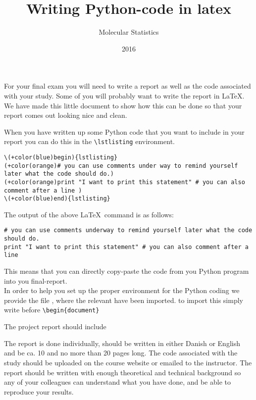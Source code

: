\documentclass{article}
\title{Writing Python-code in latex}
\author{Molecular Statistics}
\date{2016}
\begin{document}
\maketitle\thispagestyle{fancy}


For your final exam you will need to write a report as well as the code associated with your study. 
Some of you will probably want to write the report in \LaTeX. 
We have made this little document to show how this can be done so that your report comes out looking nice and clean.

When you have written up some Python code that you want to include in your report you can do this in the \verb+\lstlisting+ environment.

\begin{Verbatim}[commandchars=+\(\)]
\(+color(blue)begin){lstlisting}
(+color(orange)# you can use comments under way to remind yourself later what the code should do.)
(+color(orange)print "I want to print this statement" # you can also comment after a line )
\(+color(blue)end){lstlisting}
\end{Verbatim}

The output of the above \LaTeX \ command is as follows:

\begin{lstlisting}
# you can use comments underway to remind yourself later what the code should do.
print "I want to print this statement" # you can also comment after a line
\end{lstlisting}

This means that you can directly copy-paste the code from you Python program into you final-report.\\

In order to help you set up the proper environment for the Python coding we provide the file , where the relevant  have been imported. to import this simply write \verb++ before \verb+\begin{document}+\\

\begin{center}\large{The project report should include}\end{center}

The report is done individually, should be written in either Danish or English and be ca. 10
and no more than 20 pages long. The code associated with the study should be uploaded on the course
website or emailed to the instructor.
The report should be written with enough theoretical and technical background so any of your colleagues
can understand what you have done, and be able to reproduce your results.
\end{document}
